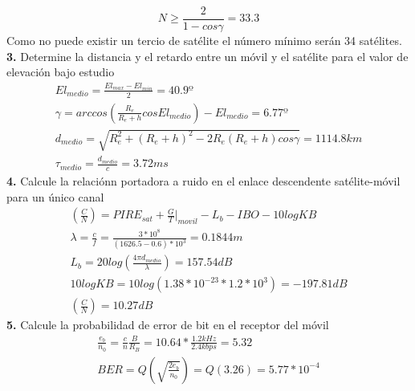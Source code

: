 \begin{exercise}[4]
	\[N\geq \frac{2}{1-cos\gamma}=33.3\]
	Como no puede existir un tercio de satélite el número mínimo serán 34 satélites.\\
	\textbf{3.} Determine la distancia y el retardo entre un móvil y el satélite para el valor de elevación bajo estudio\\
	\begin{gather*}
		El_{medio}=\frac{El_{max}-El_{min}}{2}=40.9º\\
		\gamma=arccos(\frac{R_e}{R_e+h}cosEl_{medio})-El_{medio}=6.77º\\
		d_{medio}=\sqrt{R_e^2+(R_e+h)^2-2R_e(R_e+h)cos\gamma}=1114.8km\\
		\tau_{medio}=\frac{d_{medio}}{c}=3.72ms
	\end{gather*}
	\textbf{4.} Calcule la relaciónn portadora a ruido en el enlace descendente satélite-móvil para un único canal\\
	\begin{gather*}
		(\frac{C}{N})=PIRE_{sat}+\frac{G}{T}|_{movil}-L_b-IBO-10logKB\\
		\lambda=\frac{c}{f}=\frac{3*10^8}{(1626.5-0.6)*10^3}=0.1844m\\
		L_b=20log(\frac{4\pi d_{medio}}{\lambda})=157.54dB\\
		10logKB=10log(1.38*10^{-23}*1.2*10^3)=-197.81dB\\
		(\frac{C}{N})=10.27dB
	\end{gather*}
	\textbf{5.} Calcule la probabilidad de error de bit en el receptor del móvil\\
	\begin{gather*}
		\frac{e_b}{n_0}=\frac{c}{n}\frac{B}{R_B}=10.64*\frac{1.2kHz}{2.4kbps}=5.32\\
		BER=Q(\sqrt{\frac{2e_b}{n_0}})=Q(3.26)=5.77*10^{-4}
	\end{gather*}
\end{exercise}

